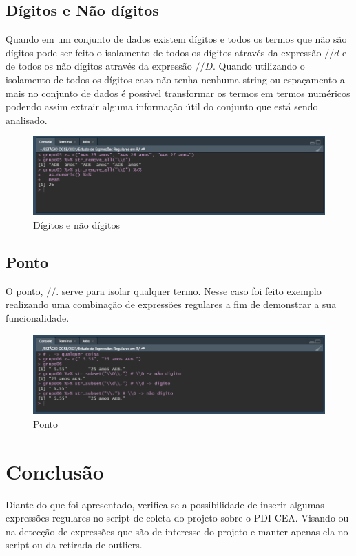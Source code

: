 \documentclass[a4paper]{article}
\begin{document}
\subsection{Dígitos e Não dígitos}
Quando em um conjunto de dados existem dígitos e todos os termos que não são dígitos pode ser feito o isolamento de todos os dígitos através da expressão $//d$ e de todos os não dígitos através da expressão $//D$. Quando utilizando o isolamento de todos os dígitos caso não tenha nenhuma string ou espaçamento a mais no conjunto de dados é possível transformar os termos em termos numéricos podendo assim extrair alguma informação útil do conjunto que está sendo analisado.
\begin{figure}[htb!]
    \centering
    \includegraphics[width=0.7\linewidth]{style/image/caso06.png}
    \caption{Dígitos e não dígitos}
    \label{fig:dígitos}
\end{figure}
\subsection{Ponto}

O ponto, $//.$ serve para isolar qualquer termo. Nesse caso foi feito exemplo realizando uma combinação de expressões regulares a fim de demonstrar a sua funcionalidade.
\begin{figure}[htb!]
    \centering
    \includegraphics[width=0.7\linewidth]{style/image/caso07.png}
    \caption{Ponto}
    \label{fig:Ponto}
\end{figure}

\section{Conclusão}
Diante do que foi apresentado, verifica-se a possibilidade de inserir algumas expressões regulares no script de coleta do projeto sobre o PDI-CEA. Visando ou na detecção de expressões que são de interesse do projeto e manter apenas ela no script ou da retirada de outliers.

\bigskip
\end{document}
